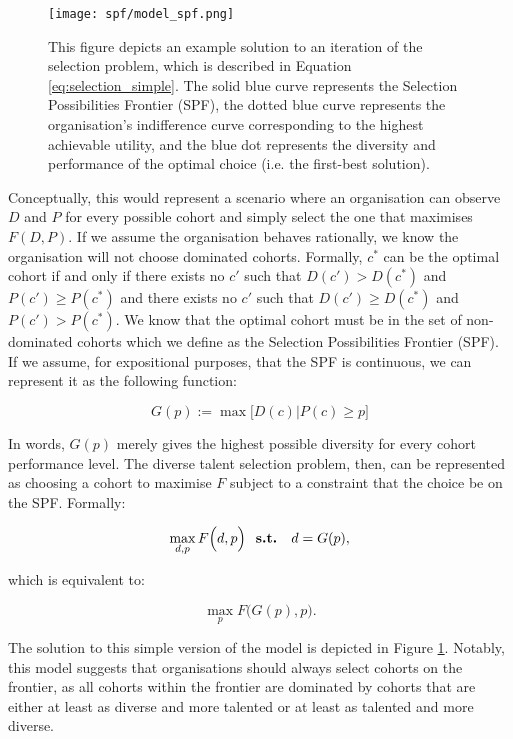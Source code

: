\begin{figure}[htbp]
    \centering
    \caption{This figure depicts an example solution to an iteration of the selection problem, which is described in Equation \ref{eq:selection_simple}. The solid blue curve represents the Selection Possibilities Frontier (SPF), the dotted blue curve represents the organisation's indifference curve corresponding to the highest achievable utility, and the blue dot represents the diversity and performance of the optimal choice (i.e. the first-best solution). }
    \label{fig:model_spf}
    \texttt{[image: spf/model\_spf.png]} 
\end{figure}

Conceptually, this would represent a scenario where an organisation can observe $D$ and $P$ for every possible cohort and simply select the one that maximises $F(D,P)$. If we assume the organisation behaves rationally, we know the organisation will not choose dominated cohorts. Formally, $c^*$ can be the optimal cohort if and only if there exists no $c'$ such that $D(c')>D(c^*)$ and $P(c')\geq P(c^*)$ and there exists no $c'$ such that $D(c')\geq D(c^*)$ and $P(c')> P(c^*)$. We know that the optimal cohort must be in the set of non-dominated cohorts which we define as the Selection Possibilities Frontier (SPF). If we assume, for expositional purposes, that the SPF is continuous, we can represent it as the following function:

\begin{equation}
G(p) := \max\Big[D(c)|P(c) \geq p\Big]
\end{equation}

\noindent In words, $G(p)$ merely gives the highest possible diversity for every cohort performance level. The diverse talent selection problem, then, can be represented as choosing a cohort to maximise $F$ subject to a constraint that the choice be on the SPF. Formally: 

\begin{equation}
\max_{d,p} F\Big(d,p\Big) \text{ \bf{ s.t. } } d = G(p), \nonumber 
\end{equation}

\noindent which is equivalent to:

\begin{equation}
\max_{p} F\Big(G(p) ,p\Big). \label{eq:selection_simple}
\end{equation}

The solution to this simple version of the model is depicted in Figure \ref{fig:model_spf}. Notably, this model suggests that organisations should always select cohorts on the frontier, as all cohorts within the frontier are dominated by cohorts that are either at least as diverse and more talented or at least as talented and more diverse.

